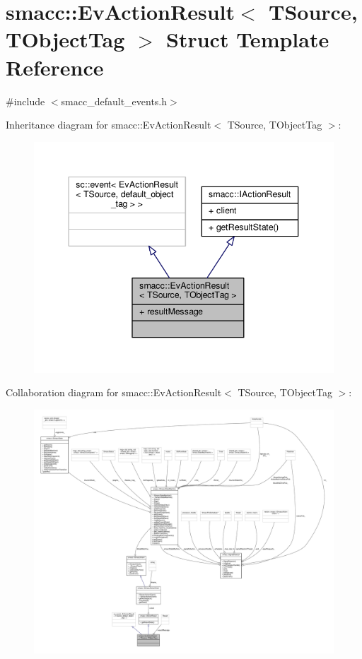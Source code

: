\hypertarget{structsmacc_1_1EvActionResult}{}\section{smacc\+:\+:Ev\+Action\+Result$<$ T\+Source, T\+Object\+Tag $>$ Struct Template Reference}
\label{structsmacc_1_1EvActionResult}


{\ttfamily \#include $<$smacc\+\_\+default\+\_\+events.\+h$>$}



Inheritance diagram for smacc\+:\+:Ev\+Action\+Result$<$ T\+Source, T\+Object\+Tag $>$\+:
\nopagebreak
\begin{figure}[H]
\begin{center}
\leavevmode
\includegraphics[width=344pt]{structsmacc_1_1EvActionResult__inherit__graph}
\end{center}
\end{figure}


Collaboration diagram for smacc\+:\+:Ev\+Action\+Result$<$ T\+Source, T\+Object\+Tag $>$\+:
\nopagebreak
\begin{figure}[H]
\begin{center}
\leavevmode
\includegraphics[width=350pt]{structsmacc_1_1EvActionResult__coll__graph}
\end{center}
\end{figure}
